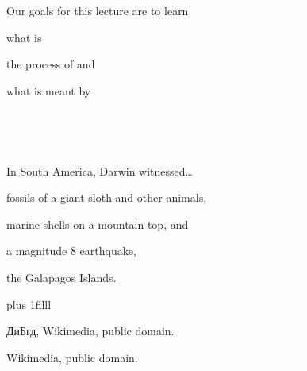 \documentclass[t]{beamer}
\begin{document}
\begin{frame}{Our goals for this lecture are to learn}
	
	\hangpara what is 

	\hangpara	the process of  and

	\hangpara what is meant by 

\end{frame}

%
{
\begin{frame}[b]

\hfill\tiny\textcolor{white}{Wikimedia, public domain.}
\end{frame}
}
%
{
\begin{frame}[t]{\textcolor{white}{The \textsc{h.m.s.} Beagle sailed around the world during 1831--1836.}}
\end{frame}
}
%
{
\begin{frame}[t]{In South America, Darwin witnessed\ldots}

	\hangpara fossils of a giant sloth and other animals,

	\hangpara marine shells on a mountain top, and

	\hangpara a magnitude 8 earthquake,

	\hangpara the Galapagos Islands.

	\vskip0pt plus 1filll

	\hfill\tiny ДиБгд, Wikimedia, public domain.
\end{frame}
}
%
{
\begin{frame}[b]

	\hfill\tiny Wikimedia, public domain.
\end{frame}
}
%
{
\begin{frame}[plain]
\end{frame}
}
%
{
\begin{frame}[t]
\end{frame}
}
%
{
\begin{frame}[t]{}
\end{frame}
}
%
\end{document}
